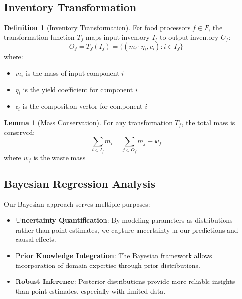 \documentclass[12pt]{article}
\theoremstyle{definition}
\newtheorem{definition}{Definition}
\newtheorem{lemma}[theorem]{Lemma}
\begin{document}
\subsection{Inventory Transformation}
\begin{definition}[Inventory Transformation]
For food processors $f \in F$, the transformation function $T_f$ maps input inventory $I_f$ to output inventory $O_f$:
\begin{equation}
    O_f = T_f(I_f) = \{(m_i \cdot \eta_i, c_i) : i \in I_f\}
\end{equation}
where:
\begin{itemize}
    \item $m_i$ is the mass of input component $i$
    \item $\eta_i$ is the yield coefficient for component $i$
    \item $c_i$ is the composition vector for component $i$
\end{itemize}
\end{definition}

\begin{lemma}[Mass Conservation]
For any transformation $T_f$, the total mass is conserved:
\begin{equation}
    \sum_{i \in I_f} m_i = \sum_{j \in O_f} m_j + w_f
\end{equation}
where $w_f$ is the waste mass.
\end{lemma}

\subsection{Bayesian Regression Analysis}
Our Bayesian approach serves multiple purposes:

\begin{itemize}
    \item \textbf{Uncertainty Quantification}: By modeling parameters as distributions rather than point estimates, we capture uncertainty in our predictions and causal effects.
    
    \item \textbf{Prior Knowledge Integration}: The Bayesian framework allows incorporation of domain expertise through prior distributions.
    
    \item \textbf{Robust Inference}: Posterior distributions provide more reliable insights than point estimates, especially with limited data.
\end{itemize}
\end{document}
